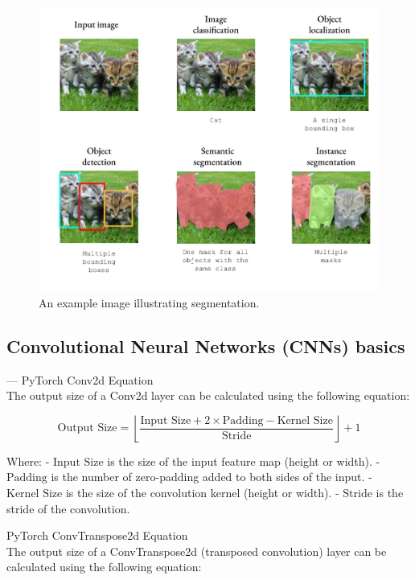 \documentclass{article}
\begin{document}
\begin{figure}[H]
    \centering
    \includegraphics[width=\linewidth]{../fig/segmentation_explain.png} %
    \caption{An example image illustrating segmentation.}
    \label{fig:example}
\end{figure}

\subsection{Convolutional Neural Networks (CNNs) basics}

--- PyTorch Conv2d Equation \\

The output size of a Conv2d layer can be calculated using the following equation:

\[ \text{Output Size} = \left\lfloor \frac{\text{Input Size} + 2 \times \text{Padding} - \text{Kernel Size}}{\text{Stride}} \right\rfloor + 1 \]

Where:
- \(\text{Input Size}\) is the size of the input feature map (height or width).
- \(\text{Padding}\) is the number of zero-padding added to both sides of the input.
- \(\text{Kernel Size}\) is the size of the convolution kernel (height or width).
- \(\text{Stride}\) is the stride of the convolution.

PyTorch ConvTranspose2d Equation\\

The output size of a ConvTranspose2d (transposed convolution) layer can be calculated using the following equation:
\end{document}
